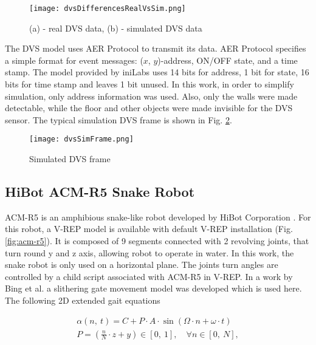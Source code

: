\begin{figure}[b]
	\centering
	\texttt{[image: dvsDifferencesRealVsSim.png]}
	\caption{(a) - real DVS data, (b) - simulated DVS data \cite{7}\label{fig:dvsDiff}}
\end{figure}

The DVS model uses AER Protocol to transmit its data. AER Protocol specifies a simple format for event messages: (\(x\), \(y\))-address, ON/OFF state, and a time stamp. The model provided by iniLabs uses 14 bits for address, 1 bit for state, 16 bits for time stamp and leaves 1 bit unused. In this work, in order to simplify simulation, only address information was used. Also, only the walls were made detectable, while the floor and other objects were made invisible for the DVS sensor. The typical simulation DVS frame is shown in Fig. \ref{fig:dvsSimFrame}.

\begin{figure}[h]
	\centering
	\texttt{[image: dvsSimFrame.png]}
	\caption{Simulated DVS frame\label{fig:dvsSimFrame}}
\end{figure}


\subsection{HiBot ACM-R5 Snake Robot}
ACM-R5 is an amphibious snake-like robot developed by HiBot Corporation \cite{3}. For this robot, a V-REP model is available with default V-REP installation (Fig. \ref{fig:acm-r5}). It is composed of 9 segments connected with 2 revolving joints, that turn round y and z axis, allowing robot to operate in water. 
In this work, the snake robot is only used on a horizontal plane. The joints turn angles are controlled by a child script associated with ACM-R5 in V-REP. In a work by Bing et al.\cite{4} a slithering gate movement model was developed which is used here. The following 2D extended gait equations 

\begin{gather*} 
\alpha(n,\ t)= C+P\cdot A\cdot\sin(\Omega\cdot n+ \omega\cdot t) \label{gateeq}\\ 
P=(\frac{n}{N}\cdot z+y)\in[0,\ 1],\quad \forall n\in[0,\ N]\tag{1},
\end{gather*}

